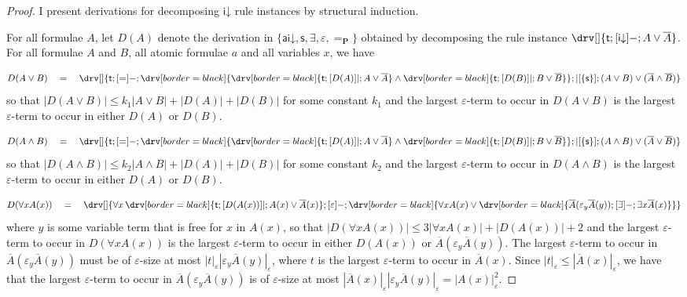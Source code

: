 \documentclass[10pt]{article}
\theoremstyle{definition}\newtheorem{remark}[theorem]{Remark}
\theoremstyle{definition}\newtheorem{example}[theorem]{Example}
\theoremstyle{definition}\newtheorem{definition}[theorem]{Definition}
\newcommand{\aiDown}{{\mathsf{ai\mathord\downarrow}}}
\newcommand{\iDown}{{\mathsf{i\mathord\downarrow}}}
\newcommand{\switch}{{\mathsf{s}}}
\newcommand{\falsifierRule}{{\mathsf{\varepsilon}}}
\newcommand{\eqProp}{=_{\textbf{P}}}
\newcommand{\trueUnit}{\mathsf{t}}
\begin{document}
	\begin{proof}
		I present derivations for decomposing $\iDown$ rule instances by structural induction.
		
		For all formulae $A$, let $D(A)$ denote the derivation in $\{\aiDown, \switch, \exists, \falsifierRule, \eqProp\}$ obtained by decomposing the rule instance $\drv[] {\trueUnit ; [\iDown]- ; A \lor \overline{A}}$. For all formulae $A$ and $B$, all atomic formulae $a$ and all variables $x$, we have
		
		\[
		D(A \lor B) \hspace{1em} = \hspace{1em} \drv[] {
			\trueUnit ; [=]- ; \drv[border=black] {
				\drv[border=black] {
					\trueUnit ; [D(A)]| ; A \lor \overline{A}
				} \land \drv[border=black] {
					\trueUnit ; [D(B)]| ; B \lor \overline{B}
				}
			} ; |[\{\switch\}] ; (A \lor B) \lor (\overline{A} \land \overline{B})
		}
		\]
		so that $| D(A \lor B) | \leq k_1| A \lor B | + | D(A) | + | D(B) |$ for some constant $k_1$ and the largest $\varepsilon$-term to occur in $D(A \lor B)$ is the largest $\varepsilon$-term to occur in either $D(A)$ or $D(B)$.
		
		\[
		D(A \land B) \hspace{1em} = \hspace{1em} \drv[] {
			\trueUnit ; [=]- ; \drv[border=black] {
				\drv[border=black] {
					\trueUnit ; [D(A)]| ; A \lor \overline{A}
				} \land \drv[border=black] {
					\trueUnit ; [D(B)]| ; B \lor \overline{B}
				}
			} ; |[\{\switch\}] ; (A \land B) \lor (\overline{A} \lor \overline{B})
		}
		\]
		so that $| D(A \land B) | \leq k_2 | A \land B | + | D(A) | + | D(B) |$ for some constant $k_2$  and the largest $\varepsilon$-term to occur in $D(A \land B)$ is the largest $\varepsilon$-term to occur in either $D(A)$ or $D(B)$.
		
		\[
		D(\forall x A(x)) \hspace{1em} = \hspace{1em} \drv[] {
			\forall x \, \drv[border=black] {
				\trueUnit ; [D(A(x))]| ; 
					A(x) \lor \overline{A}(x)
			} ; [\falsifierRule]- ; \drv[border=black] {
				\forall x A(x) \lor \drv[border=black] {
					\overline{A}(\varepsilon_y \overline{A}(y)) ; [\exists]- ; \exists x \overline{A}(x)
				}
			}
		}
		\]
		where $y$ is some variable term that is free for $x$ in $A(x)$, so that $| D(\forall x A(x)) | \leq 3 | \forall x A(x) | + | D(A(x)) | + 2$ and the largest $\varepsilon$-term to occur in $D(\forall x A(x))$ is the largest $\varepsilon$-term to occur in either $D(A(x))$ or $\overline{A}(\varepsilon_y \overline{A}(y))$. The largest $\varepsilon$-term to occur in $\overline{A}(\varepsilon_y \overline{A}(y))$ must be of $\varepsilon$-size at most $| t |_\varepsilon | \varepsilon_y \overline{A}(y) |_\varepsilon$, where $t$ is the largest $\varepsilon$-term to occur in $\overline{A}(x)$. Since $| t |_\varepsilon \leq | \overline{A}(x) |_\varepsilon$, we have that the largest $\varepsilon$-term to occur in $\overline{A}(\varepsilon_y \overline{A}(y))$ is of $\varepsilon$-size at most $| \overline{A}(x) |_\varepsilon | \varepsilon_y \overline{A}(y) |_\varepsilon = | A(x) |_\varepsilon^2$.
		

\end{proof}
\end{document}
